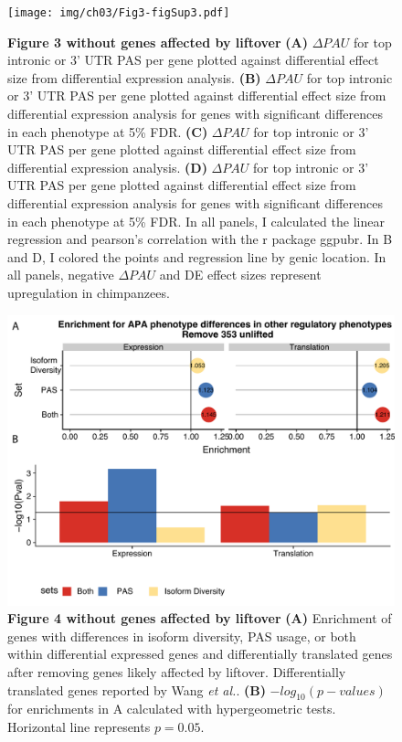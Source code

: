 \begin{figure}[!htb]
\centering
\texttt{[image: img/ch03/Fig3-figSup3.pdf]}
\caption[Figure 3 without genes affected by liftover]{\textbf{Figure 3 without genes affected by liftover} {\bf (A)} $\Delta PAU$ for top intronic or 3' UTR PAS per gene plotted against differential effect size from differential expression analysis.  {\bf (B)}  $\Delta PAU$ for top intronic or 3' UTR PAS per gene plotted against differential effect size from differential expression analysis for genes with significant differences in each phenotype at 5\% FDR. {\bf (C)}  $\Delta PAU$ for top intronic or 3' UTR PAS per gene plotted against differential effect size from differential expression analysis. {\bf (D)}  $\Delta PAU$ for top intronic or 3' UTR PAS per gene plotted against differential effect size from differential expression analysis for genes with significant differences in each phenotype at 5\% FDR. In all panels, I calculated the linear regression and pearson's correlation with the r package ggpubr. In B and D, I  colored the points and regression line by genic location. In all panels, negative $\Delta PAU$ and DE effect sizes represent upregulation in chimpanzees.}
\label{fig:ch03-unliftfig3}
\end{figure}
\clearpage



\begin{figure}[!htb]
\centering
\includegraphics[width=5in]{img/ch03/Fig4-figSup3.pdf}
\caption[Figure 4 without genes affected by liftover]{\textbf{Figure 4 without genes affected by liftover} {\bf (A)} Enrichment of genes with differences in isoform diversity, PAS usage, or both within differential expressed genes and differentially translated genes after removing genes likely affected by liftover. Differentially translated genes reported by Wang \emph{et al.}\citep{wang_post-translational_2018}. {\bf (B)}  $-log_{10}(p-values)$ for enrichments in A calculated with hypergeometric tests. Horizontal line represents $p= 0.05$.}
\label{fig:ch03-unliftfig4}
\end{figure}
\clearpage


